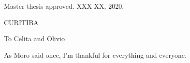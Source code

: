 \documentclass[12pt, %
               openright, %
               oneside, %
               a4paper, %
               chapter=TITLE, %
               section=TITLE, %
               brazil,
               english %
]{abntex2}
\begin{document}
%   
%   
\begin{folhadeaprovacao}
 \begin{center}
   {\ABNTEXchapterfont\large\imprimirautor}

   \vspace*{\fill}\vspace*{\fill}
   \begin{center}
     \ABNTEXchapterfont\bfseries\large\imprimirtitulo
   \end{center}
   \vspace*{\fill}

    \hspace{.45\textwidth}
    \begin{minipage}{.5\textwidth}
       \imprimirpreambulo
    \end{minipage}
   \vspace*{\fill}
 \end{center}

 Master thesis approved. XXX XX, 2020.


  \begin{center}
   \vspace*{0.5cm}
   {\large CURITIBA}
   \par
   {\large\imprimirdata}
   \vspace*{1cm}
 \end{center}

\end{folhadeaprovacao}
\begin{dedicatoria}
  \vspace*{22.7cm}
  \begin{flushright}
    \begin{minipage}[H]{4.5cm}
      {To Celita and Olivio}
    \end{minipage}
  \end{flushright}
\end{dedicatoria}
\begin{agradecimentos}
  As Moro said once, I'm thankful for everything and everyone.
\end{agradecimentos}
\end{document}
